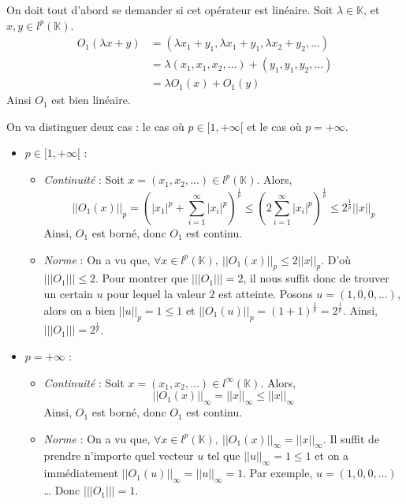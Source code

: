 \documentclass[a4paper,11pt]{article}
\theoremstyle{plain}
\theoremstyle{definition}
\begin{document}
On doit tout d'abord se demander si cet opérateur est linéaire.
Soit $\lambda \in \mathbb{K}$, et $x, y \in l^p\left(\mathbb{K}\right)$.
\[
\begin{aligned}
O_1(\lambda x + y) & = (\lambda x_1 + y_1, \lambda x_1 + y_1, \lambda x_2 + y_2, ...) \\
				   & = \lambda (x_1, x_1, x_2, ...) + (y_1, y_1, y_2, ...) \\
				   & = \lambda O_1(x) + O_1(y)
\end{aligned}
\]
Ainsi $O_1$ est bien linéaire.

On va distinguer deux cas : le cas où $p \in [1, +\infty[$ et le cas où $p = +\infty$.
\begin{itemize}
\item $p \in [1, +\infty[$ :
\begin{itemize}
\item \emph{Continuité} : Soit $x = (x_1, x_2, ...) \in l^p\left(\mathbb{K}\right)$.
Alors,
\[
||O_1(x)||_p = \left(|x_1|^p + \sum_{i = 1}^{\infty}|x_i|^p\right)^\frac{1}{p} \leq \left(2\sum_{i = 1}^{\infty}|x_i|^p\right)^\frac{1}{p} \leq 2^{\frac{1}{p}}||x||_p
\]
Ainsi, $O_1$ est borné, donc $O_1$ est continu.
\item \emph{Norme} : On a vu que, $\forall x \in l^p\left(\mathbb{K}\right), \ ||O_1(x)||_p \leq 2||x||_p$.
D'où $|||O_1||| \leq 2$.
Pour montrer que $|||O_1||| = 2$, il nous suffit donc de trouver un certain $u$ pour lequel la valeur $2$ est atteinte.
Posons $u = (1, 0, 0, ...)$, alors on a bien $||u||_p = 1 \leq 1$ et $||O_1(u)||_p = \left(1 + 1\right)^{\frac{1}{p}} = 2^{\frac{1}{p}}$.
Ainsi, $|||O_1||| = 2^{\frac{1}{p}}$.
\end{itemize}
\item $p = +\infty$ :
\begin{itemize}
\item \emph{Continuité} : Soit $x = (x_1, x_2, ...) \in l^\infty\left(\mathbb{K}\right)$.
Alors,
\[
||O_1(x)||_\infty = ||x||_\infty \leq ||x||_\infty
\]
Ainsi, $O_1$ est borné, donc $O_1$ est continu.
\item \emph{Norme} : On a vu que, $\forall x \in l^p\left(\mathbb{K}\right), \ ||O_1(x)||_\infty = ||x||_\infty$.
Il suffit de prendre n'importe quel vecteur $u$ tel que $||u||_\infty = 1 \leq 1$ et on a immédiatement $||O_1(u)||_\infty = ||u||_\infty = 1$.
Par exemple, $u = (1, 0, 0, ...)$… Donc $|||O_1||| = 1$.
\end{itemize}
\end{itemize}
\end{document}
